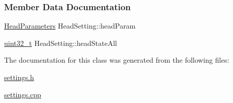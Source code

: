 \subsubsection{Member Data Documentation}
\mbox{\label{classHeadSetting_a842397f02022fd1d4217afb65beac990}} 
{\footnotesize\ttfamily \mbox{\hyperlink{classHeadSetting_ab604bc48df56fc11dd649357ae7b45b8}{Head\+Parameters}} Head\+Setting\+::\texorpdfstring{head\+Param}{headParam}}

\mbox{\label{classHeadSetting_ab80c33d0484f96c53e92ce1842fd0b43}} 
{\footnotesize\ttfamily \mbox{\hyperlink{settings_8h_a4196118492a3b1493c81f250e90af775}{uint32\+\_\+t}} Head\+Setting\+::\texorpdfstring{head\+State\+All}{headStateAll}{\ttfamily [static]}}

The documentation for this class was generated from the following files\+:\begin{DoxyCompactItemize}
\item 
\mbox{\hyperlink{settings_8h}{settings.\+h}}\item 
\mbox{\hyperlink{settings_8cpp}{settings.\+cpp}}\end{DoxyCompactItemize}
\newpage